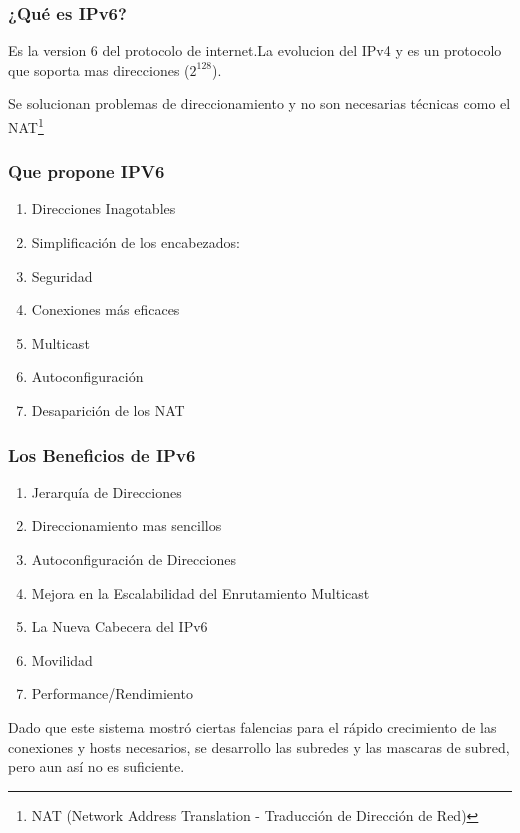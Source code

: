 \documentclass{beamer}
\begin{document}
\begin{frame}
\frametitle{¿Qué es IPv6?}

Es la version 6 del protocolo de internet.La evolucion del IPv4 y es un protocolo que soporta mas direcciones ($2^{128}$).\vspace{0.3cm}
\par Se solucionan problemas de direccionamiento y no son necesarias técnicas como el NAT\footnote{NAT (Network Address Translation - Traducción de Dirección de Red)}
\end{frame}

\begin{frame}
\frametitle{Que propone IPV6}

\begin{enumerate}[$*$]
	
 	\item Direcciones Inagotables
	\item Simplificación de los encabezados:
	\item Seguridad
	\item Conexiones más eficaces
	\item Multicast
	\item Autoconfiguración
	\item Desaparición de los NAT
\end{enumerate}
\end{frame}
\begin{frame}
\frametitle{Los Beneficios de IPv6}

\begin{enumerate}[$*$]
	
 \item Jerarquía de Direcciones
\item Direccionamiento mas sencillos
\item Autoconfiguración de Direcciones
\item Mejora en la Escalabilidad del Enrutamiento Multicast
\item La Nueva Cabecera del IPv6
\item Movilidad
\item Performance/Rendimiento



\end{enumerate}
Dado que este sistema mostró ciertas falencias para el rápido crecimiento de las conexiones y hosts
necesarios, se desarrollo las subredes y las mascaras de subred, pero aun así no es suficiente.

\end{frame}
\end{document}
